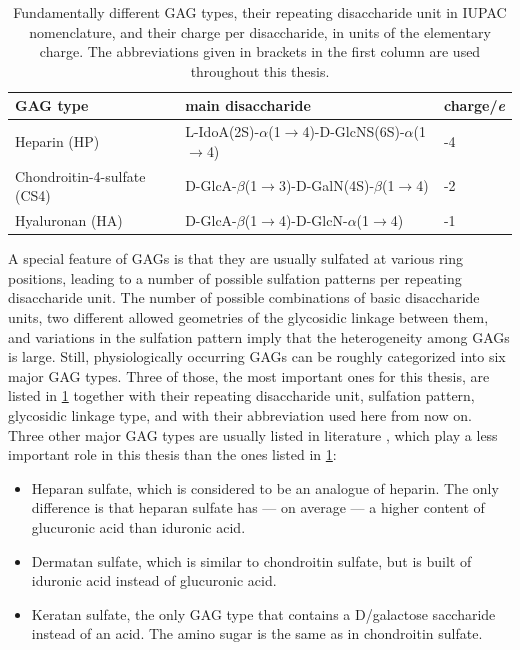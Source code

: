 

\begin{table}
\scriptsize
\centering
\renewcommand{\arraystretch}{1.3}
\begin{tabular}{lll}
\midrule
GAG type & main disaccharide & charge/\si{\elementarycharge} \\
\midrule
Heparin (HP) & L-IdoA(2S)-$\alpha$(1$\rightarrow$4)-D-GlcNS(6S)-$\alpha$(1$\rightarrow$4) & -4 \\
Chondroitin-4-sulfate (CS4) & D-GlcA-$\beta$(1$\rightarrow$3)-D-GalN(4S)-$\beta$(1$\rightarrow$4) & -2 \\
Hyaluronan (HA) & D-GlcA-$\beta$(1$\rightarrow$4)-D-GlcN-$\alpha$(1$\rightarrow$4) & -1 \\
\midrule
\end{tabular}
\caption{
Fundamentally different GAG types, their repeating disaccharide unit in IUPAC
nomenclature, and their charge per disaccharide, in units of the elementary
charge. The abbreviations given in brackets in the first column are used
throughout this thesis.}
\label{tab:bg:gagtypes}
\end{table}


A special feature of GAGs is that they are usually sulfated at various ring
positions, leading to a number of possible sulfation patterns per repeating
disaccharide unit. The number of possible combinations of basic disaccharide
units, two different allowed geometries of the glycosidic linkage between them,
and variations in the sulfation pattern imply that the heterogeneity among GAGs
is large. Still, physiologically occurring GAGs can be roughly categorized into
six major GAG types. Three of those, the most important ones for this thesis,
are listed in \cref{tab:bg:gagtypes} together with their repeating disaccharide
unit, sulfation pattern, glycosidic linkage type, and with their abbreviation
used here from now on. Three other major GAG types are usually listed in
literature \cite{gandhi_structure_2008}, which play a less important role in
this thesis than the ones listed in \cref{tab:bg:gagtypes}:

\begin{itemize}
\item Heparan sulfate, which is considered to be an analogue of heparin. The
only difference is that heparan sulfate has --- on average --- a higher content
of glucuronic acid than iduronic acid.
\item Dermatan sulfate, which is similar to chondroitin sulfate, but is built of
iduronic acid instead of glucuronic acid.
\item Keratan sulfate, the only GAG type that contains a D\-/galactose
saccharide instead of an acid. The amino sugar is the same as in chondroitin
sulfate.
\end{itemize}


